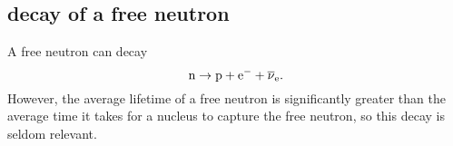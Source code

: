\subsection{decay of a free neutron}
A free neutron can decay
$${\hbox{n}}\to {\hbox{p}}+{\hbox{e}}^{-}+\overline {\nu }_{{{\mathrm {e}}}}\mathrm{.}$$
However, the average lifetime of a free neutron is significantly greater than the average time it takes for a nucleus to capture the free neutron, so this decay is seldom relevant.
